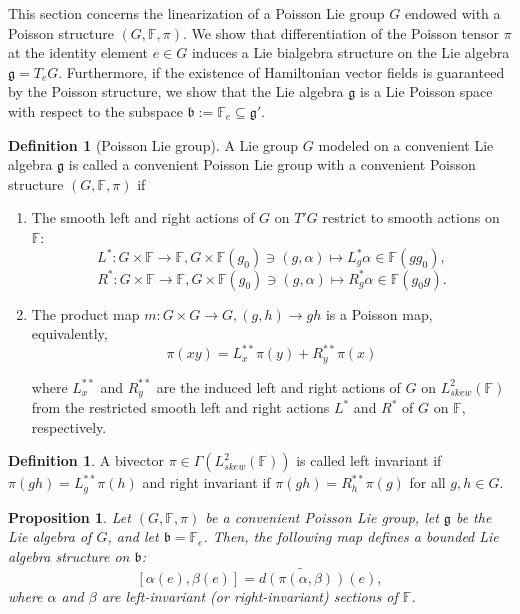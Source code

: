 \documentclass[11pt,reqno]{amsart}
\newtheorem{proposition}[theorem]{Proposition}
\theoremstyle{definition}
\newtheorem{definition}[theorem]{Definition}
\numberwithin{equation}{section}
\begin{document}
This section concerns the linearization of a Poisson Lie group $G$ endowed with a Poisson structure $(G, \mathbb{F}, \pi)$. We show that differentiation of the Poisson tensor $\pi$ at the identity element $e \in G$ induces a Lie bialgebra structure on the Lie algebra $\mathfrak{g} = T_e G$. Furthermore, if the existence of Hamiltonian vector fields is guaranteed by the Poisson structure, we show that the Lie algebra $\mathfrak{g}$ is a Lie Poisson space with respect to the subspace $\mathfrak{b} := \mathbb{F}_e \subseteq \mathfrak{g}'$.

\begin{definition}[Poisson Lie group] \label{Lie-Poisson-group}
A Lie group $G$ modeled on a convenient Lie algebra $\mathfrak{g}$ is called a convenient Poisson Lie group with a convenient Poisson structure $(G, \mathbb{F}, \pi)$ if 
\begin{enumerate}
    \item The smooth left and right actions of $G$ on $T'G$ restrict to  smooth actions on $\mathbb F:$ \[ L^{*}: G\times \mathbb F \to \mathbb F, G\times \mathbb F(g_0)\ni(g, \alpha)\mapsto L_{g}^*\alpha\in \mathbb F(gg_0) ,\]
    \[ R^{*}: G\times \mathbb F \to \mathbb F, G\times \mathbb F(g_0)\ni(g, \alpha)\mapsto R_{g}^*\alpha\in \mathbb F(g_0g).\]


\item The product map $m:G \times G\to G, (g,h)\to gh$ is a Poisson map, equivalently,
\begin{equation} \label{multiplicative}  
\pi(xy) = L^{**}_x\pi(y) + R^{**}_y\pi(x)
\end{equation}

where $L^{**}_x$ and $R^{**}_y$ are the induced left and right actions of $G$ on $L^2_{skew}(\mathbb F)$ from the restricted smooth left and right actions $L^*$ and $R^*$ of $G$ on $\mathbb F$, respectively.
\end{enumerate}
\end{definition}


\begin{definition}
A bivector  $\pi \in \Gamma(L^2_{skew}(\mathbb F))$ is called left invariant if $\pi(gh) = L_{g}^{**}\pi(h)$ and right invariant if $\pi(gh) = R_{h}^{**}\pi(g)$ for all $g, h \in G$.
\end{definition}
\begin{proposition}\label{linearization}
Let $(G, \mathbb{F}, \pi)$ be a convenient Poisson Lie group, let $\mathfrak{g}$ be the Lie algebra of $G$, and let $\mathfrak{b} = \mathbb{F}_e$. Then, the following map defines a bounded Lie algebra structure on $\mathfrak{b}$:
\begin{equation} \label{linearzitaion_of_pi}
[\alpha(e), \beta(e)] = \widetilde{d(\pi(\alpha, \beta))}(e),
\end{equation}
where $\alpha$ and $\beta$ are left-invariant (or right-invariant) sections of $\mathbb{F}$.
\end{proposition}
\end{document}
